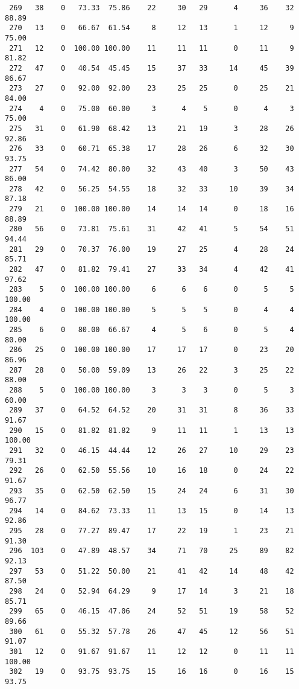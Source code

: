 \begin{verbatim}
 269   38    0   73.33  75.86    22     30   29      4     36    32    88.89
 270   13    0   66.67  61.54     8     12   13      1     12     9    75.00
 271   12    0  100.00 100.00    11     11   11      0     11     9    81.82
 272   47    0   40.54  45.45    15     37   33     14     45    39    86.67
 273   27    0   92.00  92.00    23     25   25      0     25    21    84.00
 274    4    0   75.00  60.00     3      4    5      0      4     3    75.00
 275   31    0   61.90  68.42    13     21   19      3     28    26    92.86
 276   33    0   60.71  65.38    17     28   26      6     32    30    93.75
 277   54    0   74.42  80.00    32     43   40      3     50    43    86.00
 278   42    0   56.25  54.55    18     32   33     10     39    34    87.18
 279   21    0  100.00 100.00    14     14   14      0     18    16    88.89
 280   56    0   73.81  75.61    31     42   41      5     54    51    94.44
 281   29    0   70.37  76.00    19     27   25      4     28    24    85.71
 282   47    0   81.82  79.41    27     33   34      4     42    41    97.62
 283    5    0  100.00 100.00     6      6    6      0      5     5   100.00
 284    4    0  100.00 100.00     5      5    5      0      4     4   100.00
 285    6    0   80.00  66.67     4      5    6      0      5     4    80.00
 286   25    0  100.00 100.00    17     17   17      0     23    20    86.96
 287   28    0   50.00  59.09    13     26   22      3     25    22    88.00
 288    5    0  100.00 100.00     3      3    3      0      5     3    60.00
 289   37    0   64.52  64.52    20     31   31      8     36    33    91.67
 290   15    0   81.82  81.82     9     11   11      1     13    13   100.00
 291   32    0   46.15  44.44    12     26   27     10     29    23    79.31
 292   26    0   62.50  55.56    10     16   18      0     24    22    91.67
 293   35    0   62.50  62.50    15     24   24      6     31    30    96.77
 294   14    0   84.62  73.33    11     13   15      0     14    13    92.86
 295   28    0   77.27  89.47    17     22   19      1     23    21    91.30
 296  103    0   47.89  48.57    34     71   70     25     89    82    92.13
 297   53    0   51.22  50.00    21     41   42     14     48    42    87.50
 298   24    0   52.94  64.29     9     17   14      3     21    18    85.71
 299   65    0   46.15  47.06    24     52   51     19     58    52    89.66
 300   61    0   55.32  57.78    26     47   45     12     56    51    91.07
 301   12    0   91.67  91.67    11     12   12      0     11    11   100.00
 302   19    0   93.75  93.75    15     16   16      0     16    15    93.75

\end{verbatim}
